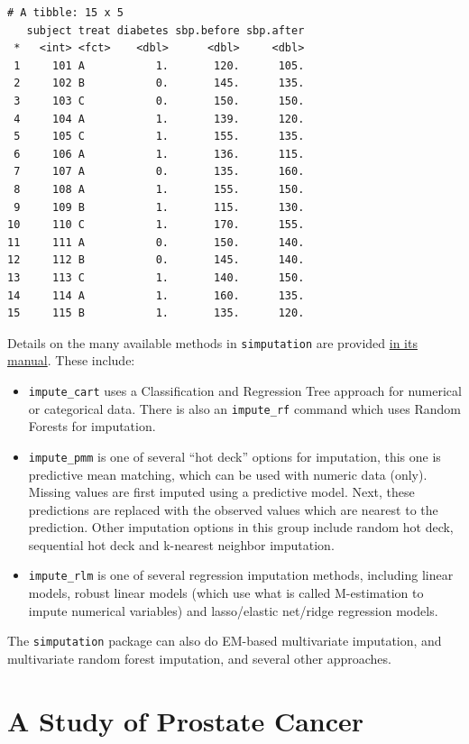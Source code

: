 \documentclass[]{book}
\providecommand{\tightlist}{%
  \setlength{\itemsep}{0pt}\setlength{\parskip}{0pt}}
\theoremstyle{definition}
\theoremstyle{definition}
\theoremstyle{definition}
\theoremstyle{remark}
\begin{document}
\begin{verbatim}
# A tibble: 15 x 5
   subject treat diabetes sbp.before sbp.after
 *   <int> <fct>    <dbl>      <dbl>     <dbl>
 1     101 A           1.       120.      105.
 2     102 B           0.       145.      135.
 3     103 C           0.       150.      150.
 4     104 A           1.       139.      120.
 5     105 C           1.       155.      135.
 6     106 A           1.       136.      115.
 7     107 A           0.       135.      160.
 8     108 A           1.       155.      150.
 9     109 B           1.       115.      130.
10     110 C           1.       170.      155.
11     111 A           0.       150.      140.
12     112 B           0.       145.      140.
13     113 C           1.       140.      150.
14     114 A           1.       160.      135.
15     115 B           1.       135.      120.
\end{verbatim}

Details on the many available methods in \texttt{simputation} are
provided
\href{https://cran.r-project.org/web/packages/simputation/simputation.pdf}{in
its manual}. These include:

\begin{itemize}
\tightlist
\item
  \texttt{impute\_cart} uses a Classification and Regression Tree
  approach for numerical or categorical data. There is also an
  \texttt{impute\_rf} command which uses Random Forests for imputation.
\item
  \texttt{impute\_pmm} is one of several ``hot deck'' options for
  imputation, this one is predictive mean matching, which can be used
  with numeric data (only). Missing values are first imputed using a
  predictive model. Next, these predictions are replaced with the
  observed values which are nearest to the prediction. Other imputation
  options in this group include random hot deck, sequential hot deck and
  k-nearest neighbor imputation.
\item
  \texttt{impute\_rlm} is one of several regression imputation methods,
  including linear models, robust linear models (which use what is
  called M-estimation to impute numerical variables) and lasso/elastic
  net/ridge regression models.
\end{itemize}

The \texttt{simputation} package can also do EM-based multivariate
imputation, and multivariate random forest imputation, and several other
approaches.

\chapter{A Study of Prostate Cancer}\label{a-study-of-prostate-cancer}
\end{document}
